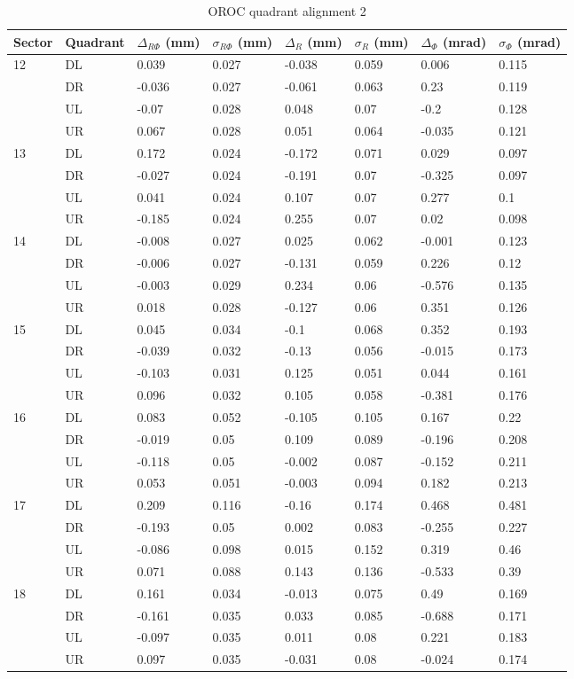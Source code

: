 \begin{table}
\caption{OROC quadrant alignment 2}
\begin{tabular}{|l|l|l|l|l|l|l|l|} \hline
Sector & Quadrant & $\Delta_{R\Phi}$ (mm)& $\sigma_{R\Phi}$ (mm) &
 $\Delta_{R}$ (mm)& $\sigma_{R}$ (mm) & $\Delta_{\Phi}$ (mrad)& $\sigma_{\Phi}$ (mrad)\\ \hline
12&DL&0.039&0.027&-0.038&0.059&0.006&0.115\\ \hline
&DR&-0.036&0.027&-0.061&0.063&0.23&0.119\\ \hline
&UL&-0.07&0.028&0.048&0.07&-0.2&0.128\\ \hline
&UR&0.067&0.028&0.051&0.064&-0.035&0.121\\ \hline
13&DL&0.172&0.024&-0.172&0.071&0.029&0.097\\ \hline
&DR&-0.027&0.024&-0.191&0.07&-0.325&0.097\\ \hline
&UL&0.041&0.024&0.107&0.07&0.277&0.1\\ \hline
&UR&-0.185&0.024&0.255&0.07&0.02&0.098\\ \hline
14&DL&-0.008&0.027&0.025&0.062&-0.001&0.123\\ \hline
&DR&-0.006&0.027&-0.131&0.059&0.226&0.12\\ \hline
&UL&-0.003&0.029&0.234&0.06&-0.576&0.135\\ \hline
&UR&0.018&0.028&-0.127&0.06&0.351&0.126\\ \hline
15&DL&0.045&0.034&-0.1&0.068&0.352&0.193\\ \hline
&DR&-0.039&0.032&-0.13&0.056&-0.015&0.173\\ \hline
&UL&-0.103&0.031&0.125&0.051&0.044&0.161\\ \hline
&UR&0.096&0.032&0.105&0.058&-0.381&0.176\\ \hline
16&DL&0.083&0.052&-0.105&0.105&0.167&0.22\\ \hline
&DR&-0.019&0.05&0.109&0.089&-0.196&0.208\\ \hline
&UL&-0.118&0.05&-0.002&0.087&-0.152&0.211\\ \hline
&UR&0.053&0.051&-0.003&0.094&0.182&0.213\\ \hline
17&DL&0.209&0.116&-0.16&0.174&0.468&0.481\\ \hline
&DR&-0.193&0.05&0.002&0.083&-0.255&0.227\\ \hline
&UL&-0.086&0.098&0.015&0.152&0.319&0.46\\ \hline
&UR&0.071&0.088&0.143&0.136&-0.533&0.39\\ \hline
18&DL&0.161&0.034&-0.013&0.075&0.49&0.169\\ \hline
&DR&-0.161&0.035&0.033&0.085&-0.688&0.171\\ \hline
&UL&-0.097&0.035&0.011&0.08&0.221&0.183\\ \hline
&UR&0.097&0.035&-0.031&0.08&-0.024&0.174\\ \hline
\end{tabular}
\label{table:QudrantAlignement}
\end{table}
